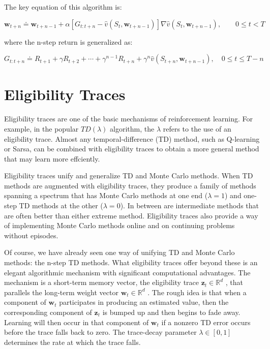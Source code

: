 \documentclass{article}
\begin{document}
The key equation of this algorithm is:

$$
\mathbf { w } _ { t + n } \doteq \mathbf { w } _ { t + n - 1 } + \alpha \left[ G _ { t : t + n } - \hat { v } ( S _ { t } \mathbf { , } \mathbf { w } _ { t + n - 1 } ) \right] \nabla \hat { v } ( S _ { t } \mathbf { , } \mathbf { w } _ { t + n - 1 } ) , \qquad 0 \leq t < T
$$

where the n-step return is generalized as:

$$
G _ { t : t + n } \doteq R _ { t + 1 } + \gamma R _ { t + 2 } + \cdots + \gamma ^ { n - 1 } R _ { t + n } + \gamma ^ { n } \hat { v } ( S _ { t + n } , \mathbf { w } _ { t + n - 1 } ) , \quad 0 \leq t \leq T - n
$$

\section{Eligibility Traces}

Eligibility traces are one of the basic mechanisms of reinforcement learning. For example, in the popular $TD(\lambda)$ algorithm, the $\lambda$ refers to the use of an eligibility trace. Almost any temporal-difference (TD) method, such as Q-learning or Sarsa, 
can be combined with eligibility traces to obtain a more general method that may learn more effciently.

Eligibility traces unify and generalize TD and Monte Carlo methods. When TD methods are augmented with eligibility traces, they produce a family of methods spanning a spectrum that has Monte Carlo methods at one end ($\lambda = 1$) and one-step TD methods at the other ($\lambda = 0$). 
In between are intermediate methods that are often better than either extreme method. Eligibility traces also provide a way of implementing Monte Carlo methods online and on continuing problems without episodes.

Of course, we have already seen one way of unifying TD and Monte Carlo methods: the n-step TD methods. What eligibility traces offer beyond these is an elegant algorithmic mechanism with significant computational advantages. The mechanism is a short-term memory vector, 
the eligibility trace $\mathbf { z } _ { t } \in \mathbb { R } ^ { d }$ , that parallels the long-term weight vector $\mathbf { w } _ { t } \in \mathbb { R } ^ { d }$ . The rough idea is that when a component of $\mathbf { w } _ { t }$ participates in producing an estimated value, 
then the corresponding component of $\mathbf { z } _ { t }$ is bumped up and then begins to fade away. Learning will then occur in that component of $\mathbf { w } _ { t }$ if a nonzero TD error occurs before the trace falls back to zero. The trace-decay parameter $\lambda \in [ 0 , 1 ]$ determines 
the rate at which the trace falls.
\end{document}
